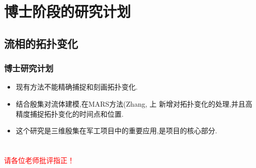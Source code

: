 \documentclass[UTF8]{ctexbeamer}	%
\theoremstyle{plain}
\theoremstyle{definition}
\theoremstyle{remark}
\numberwithin{equation}{section}
\begin{document}
\section{博士阶段的研究计划}
\subsection{流相的拓扑变化}
\begin{frame}
    \frametitle{博士研究计划}
    \begin{center}
    \end{center}
    \begin{itemize}
        \item 现有方法不能精确捕捉和刻画拓扑变化.
        \item 结合殷集对流体建模,在MARS方法(Zhang, 上
              新增对拓扑变化的处理,并且高精度捕捉拓扑变化的时间点和位置.
        \item 这个研究是三维殷集在军工项目中的重要应用,是项目的核心部分.
    \end{itemize}
\end{frame}



\section*{}
\begin{frame}
    \centering\huge
    \textcolor{red}{请各位老师批评指正！}
\end{frame}
\end{document}
